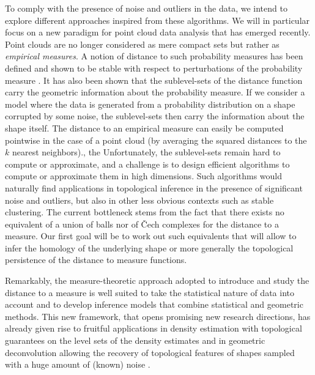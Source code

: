 To comply with the presence of noise and outliers in the data, we intend to explore different approaches inspired from these algorithms.  We will in particular focus on a new paradigm for point cloud data analysis that has emerged recently. Point clouds are no longer considered as mere compact sets but rather as {\em empirical measures}. A notion of distance to such probability measures has been defined and shown to be stable with respect to perturbations of the probability measure \cite{ccsm-gipm-2011}. It has also been shown that the sublevel-sets of the distance function carry the geometric information about the probability measure. If we consider a model where the data is generated from a probability distribution on a shape corrupted by some noise, the sublevel-sets then carry the information about the shape itself.
The distance to an empirical measure can easily be computed pointwise in the case of a point cloud (by averaging the squared distances to the $k$ nearest neighbors)., the Unfortunately, the sublevel-sets remain hard to compute or approximate, and a
challenge is to design efficient algorithms to compute or approximate them  in high dimensions. Such algorithms would naturally find applications in topological inference in the presence of significant noise and outliers, but also in other less obvious contexts such as stable clustering. The current bottleneck stems from the fact that there exists no equivalent of a union of balls nor of \v{C}ech complexes for the distance to a measure. Our first goal will be to work out such equivalents that will allow to infer the homology of the underlying shape or more generally the topological persistence of the distance to measure functions.

Remarkably, the measure-theoretic approach adopted to introduce and study the distance to a measure is well suited to take the statistical nature of data into account and to develop inference models that combine statistical and geometric methods. This new framework, that opens promising new research directions, has already given rise to fruitful applications in density estimation with topological guarantees on the level sets of the density estimates \cite{bccdr-wknde-11}  and  in geometric deconvolution allowing the recovery of  topological features of shapes sampled with a huge amount of (known) noise  \cite{ccdm-dwmgi-11}.


